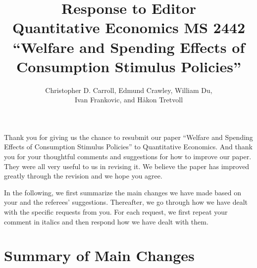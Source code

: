 \documentclass[12pt,letterpaper,english]{article}
\title{\textbf{Response to Editor\\ Quantitative Economics MS 2442 \\``Welfare and Spending Effects of \\ Consumption Stimulus Policies''}}
\author{Christopher D. Carroll, Edmund Crawley, William Du, \\ Ivan Frankovic, and H\aa kon Tretvoll}
\date{}
\begin{document}
	\onehalfspacing
	\maketitle
	
	\noindent Thank you for giving us the chance to resubmit our paper ``Welfare and Spending Effects of Consumption Stimulus Policies'' to Quantitative Economics. And thank you for your thoughtful comments and suggestions for how to improve our paper. They were all very useful to us in revising it. We believe the paper has improved greatly through the revision and we hope you agree. 
	
	In the following, we first summarize the main changes we have made based on your and the referees' suggestions. Thereafter, we go through how we have dealt with the specific requests from you. For each request, we first repeat your comment in italics and then respond how we have dealt with them.
	
	\section{Summary of Main Changes}
	

	
	\newpage 
	
\end{document}
